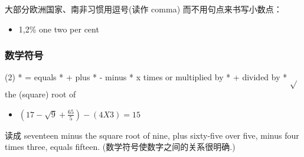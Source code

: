  大部分欧洲国家、南非习惯用逗号(读作 comma) 而不用句点来书写小数点：
 \begin{itemize}
 \item 1,2\% one  two per cent
 \end{itemize}

 \subsubsection{数学符号}
 \begin{taskitem}(2)
 * = equals
 * + plus
 * - minus
 * x times or multiplied by
 * + divided by
 * $\sqrt{}$ the (square) root of
 \end{taskitem}

 \begin{itemize}
 \item $(17 - \sqrt{9} + \frac{65}{5}) - (4X3) =15$
 \end{itemize}
读成 seventeen minus the square root of nine, plus sixty-five over five,
minus four times three, equals fifteen. (数学符号使数字之间的关系很明确.)



